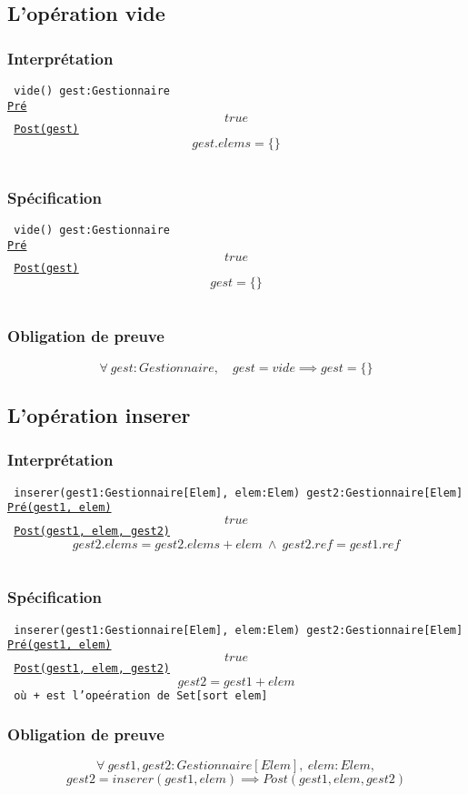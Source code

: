 \documentclass{article}
\begin{document}
\subsection{L'opération vide}
\subsubsection{Interprétation}
{\tt
vide() gest:Gestionnaire\\
\underline{Pré}
$$ true $$
\underline{Post(gest)}
$$ gest.elems = \{\} $$
}

\subsubsection{Spécification}
{\tt
vide() gest:Gestionnaire\\
\underline{Pré}
$$ true $$
\underline{Post(gest)}
$$ gest = \{\} $$
}

\subsubsection{Obligation de preuve}
$$ \forall\ gest:Gestionnaire,\quad gest = vide \implies gest = \{\} $$

\subsection{L'opération inserer}
\subsubsection{Interprétation}
{\tt
inserer(gest1:Gestionnaire[Elem], elem:Elem) gest2:Gestionnaire[Elem]\\
\underline{Pré(gest1, elem)}
$$ true $$
\underline{Post(gest1, elem, gest2)}
$$ gest2.elems = gest2.elems + elem\ \wedge\ gest2.ref = gest1.ref $$
}

\subsubsection{Spécification}
{\tt
inserer(gest1:Gestionnaire[Elem], elem:Elem) gest2:Gestionnaire[Elem]\\
\underline{Pré(gest1, elem)}
$$ true $$
\underline{Post(gest1, elem, gest2)}
$$ gest2 = gest1 + elem $$
où + est l'opeération de Set[sort elem]
}

\subsubsection{Obligation de preuve}
$$ \forall\ gest1,gest2:Gestionnaire[Elem],\ elem:Elem,$$
$$gest2 = inserer(gest1, elem) \implies Post(gest1, elem, gest2) $$
\end{document}
